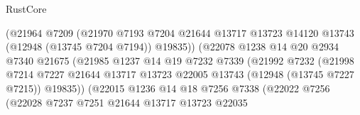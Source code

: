 \begin{lexlean}{RustCore}
\begin{coremodule}
                                      (@21964
                                        @7209
                                        (@21970
                                          @7193
                                          @7204
                                          @21644
                                          @13717
                                          @13723
                                          @14120
                                          @13743
                                          (@12948 (@13745 @7204 @7194))
                                          @19835))
                                      (@22078
                                        @1238
                                        @14
                                        @20
                                        @2934
                                        @7340
                                        @21675
                                        (@21985
                                          @1237
                                          @14
                                          @19
                                          @7232
                                          @7339
                                          (@21992
                                            @7232
                                            (@21998
                                              @7214
                                              @7227
                                              @21644
                                              @13717
                                              @13723
                                              @22005
                                              @13743
                                              (@12948 (@13745 @7227 @7215))
                                              @19835))
                                          (@22015
                                            @1236
                                            @14
                                            @18
                                            @7256
                                            @7338
                                            (@22022
                                              @7256
                                              (@22028
                                                @7237
                                                @7251
                                                @21644
                                                @13717
                                                @13723
                                                @22035

\end{coremodule}
\end{lexlean}
